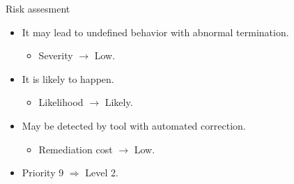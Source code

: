 \begin{frame}[t]{Risk assesment}
\begin{itemize}
  \item It may lead to undefined behavior with abnormal termination.
    \begin{itemize}
      \item Severity $\rightarrow$ Low.
    \end{itemize}

  \vfill
  \item It is likely to happen.
    \begin{itemize}
      \item Likelihood $\rightarrow$ Likely.
    \end{itemize}

  \vfill
  \item May be detected by tool with automated correction.
    \begin{itemize}
      \item Remediation cost $\rightarrow$ Low.
    \end{itemize}

  \vfill
  \item Priority 9 $\Rightarrow$ Level 2.
\end{itemize}
\end{frame}
